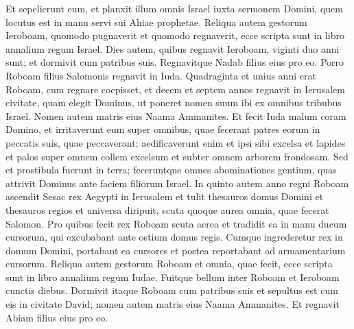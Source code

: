 \begin{biblechapter}
\verse Et sepelierunt eum, et planxit illum omnis Israel iuxta sermonem Domini, quem locutus est in manu servi sui Ahiae prophetae. 
\verse Reliqua autem gestorum Ieroboam, quomodo pugnaverit et quomodo regnaverit, ecce scripta sunt in libro annalium regum Israel. 
\verse Dies autem, quibus regnavit Ieroboam, viginti duo anni sunt; et dormivit cum patribus suis. Regnavitque Nadab filius eius pro eo. 
\verse Porro Roboam filius Salomonis regnavit in Iuda. Quadraginta et unius anni erat Roboam, cum regnare coepisset, et decem et septem annos regnavit in Ierusalem civitate, quam elegit Dominus, ut poneret nomen suum ibi ex omnibus tribubus Israel. Nomen autem matris eius Naama Ammanites. 
\verse Et fecit Iuda malum coram Domino, et irritaverunt eum super omnibus, quae fecerant patres eorum in peccatis suis, quae peccaverant; 
\verse aedificaverunt enim et ipsi sibi excelsa et lapides et palos super omnem collem excelsum et subter omnem arborem frondosam. 
\verse Sed et prostibula fuerunt in terra; feceruntque omnes abominationes gentium, quas attrivit Dominus ante faciem filiorum Israel. 
\verse In quinto autem anno regni Roboam ascendit Sesac rex Aegypti in Ierusalem  
\verse et tulit thesauros domus Domini et thesauros regios et universa diripuit, scuta quoque aurea omnia, quae fecerat Salomon. 
\verse Pro quibus fecit rex Roboam scuta aerea et tradidit ea in manu ducum cursorum, qui excubabant ante ostium domus regis. 
\verse Cumque ingrederetur rex in domum Domini, portabant ea cursores et postea reportabant ad armamentarium cursorum. 
\verse Reliqua autem gestorum Roboam et omnia, quae fecit, ecce scripta sunt in libro annalium regum Iudae. 
\verse Fuitque bellum inter Roboam et Ieroboam cunctis diebus. 
\verse Dormivit itaque Roboam cum patribus suis et sepultus est cum eis in civitate David; nomen autem matris eius Naama Ammanites. Et regnavit Abiam filius eius pro eo. 
\end{biblechapter}

